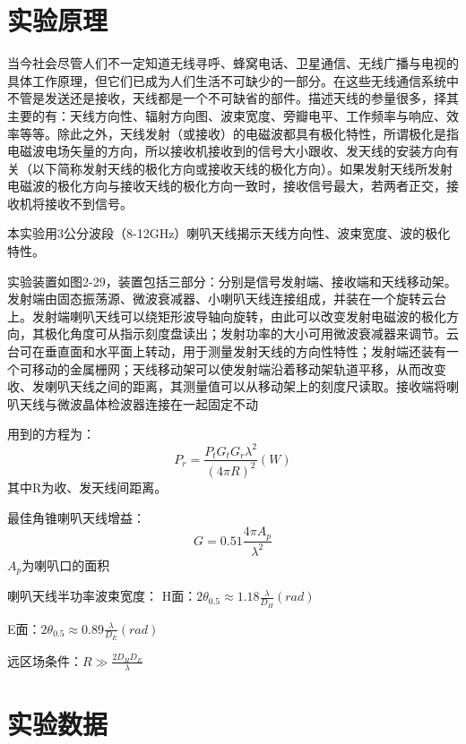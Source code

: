 \documentclass{../source/zjureport}
\begin{document}
    \section{实验原理}
    当今社会尽管人们不一定知道无线寻呼、蜂窝电话、卫星通信、无线广播与电视的具体工作原理，但它们已成为人们生活不可缺少的一部分。在这些无线通信系统中不管是发送还是接收，天线都是一个不可缺省的部件。描述天线的参量很多，择其主要的有：天线方向性、辐射方向图、波束宽度、旁瓣电平、工作频率与响应、效率等等。除此之外，天线发射（或接收）的电磁波都具有极化特性，所谓极化是指电磁波电场矢量的方向，所以接收机接收到的信号大小跟收、发天线的安装方向有关（以下简称发射天线的极化方向或接收天线的极化方向）。如果发射天线所发射电磁波的极化方向与接收天线的极化方向一致时，接收信号最大，若两者正交，接收机将接收不到信号。

    本实验用3公分波段（8-12GHz）喇叭天线揭示天线方向性、波束宽度、波的极化特性。

    实验装置如图2-29，装置包括三部分：分别是信号发射端、接收端和天线移动架。发射端由固态振荡源、微波衰减器、小喇叭天线连接组成，并装在一个旋转云台上。发射端喇叭天线可以绕矩形波导轴向旋转，由此可以改变发射电磁波的极化方向，其极化角度可从指示刻度盘读出；发射功率的大小可用微波衰减器来调节。云台可在垂直面和水平面上转动，用于测量发射天线的方向性特性；发射端还装有一个可移动的金属栅网；天线移动架可以使发射端沿着移动架轨道平移，从而改变收、发喇叭天线之间的距离，其测量值可以从移动架上的刻度尺读取。接收端将喇叭天线与微波晶体检波器连接在一起固定不动

    用到的方程为：
    $$P_r = \frac{P_tG_tG_r\lambda^2}{\left( 4\pi R \right)^2}\left( W \right)$$
    其中R为收、发天线间距离。

    最佳角锥喇叭天线增益： 
    $$G = 0.51\frac{4\pi A_p}{\lambda^2}$$
    $A_p$为喇叭口的面积

    喇叭天线半功率波束宽度：
    H面：$2\theta _{0.5}\approx 1.18\frac{\lambda}{D_H}\left( rad \right)$

    E面：$2\theta _{0.5}\approx 0.89\frac{\lambda}{D_E}\left( rad \right)$

    远区场条件：$R\gg \frac{2D_HD_E}{\lambda}$

    \section{实验数据}
    \newpage
\end{document}
